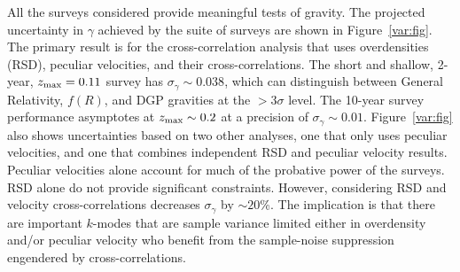 \documentclass[11pt, oneside]{article}   	%
\begin{document}
%
%
%
All the surveys considered  provide meaningful tests of gravity.
The projected uncertainty in $\gamma$ achieved by the suite of surveys are shown in Figure~\ref{var:fig}.
The primary result is for the cross-correlation analysis that uses overdensities (RSD), peculiar velocities, and their cross-correlations.
The short and shallow,  2-year, $z_{\rm max}=0.11$ survey has $\sigma_\gamma \sim 0.038$,
which can distinguish  between  General Relativity, $f(R)$,  and DGP gravities at the $>3\sigma$ level.
The 10-year survey performance asymptotes at $z_{\rm max} \sim0.2$ at a precision of  $\sigma_\gamma \sim 0.01$.
Figure~\ref{var:fig} also shows uncertainties based on two other analyses, one that only uses peculiar velocities, and
one that combines independent RSD and peculiar velocity results.
Peculiar velocities alone
account for much of the probative power of the surveys. RSD alone do not provide significant constraints.
However, considering RSD and velocity cross-correlations decreases $\sigma_\gamma$ by  $\sim 20$\%.
The implication is that there are important
$k$-modes that are  sample variance limited either in  overdensity and/or peculiar velocity who benefit from the
sample-noise suppression engendered by cross-correlations.
\end{document}
